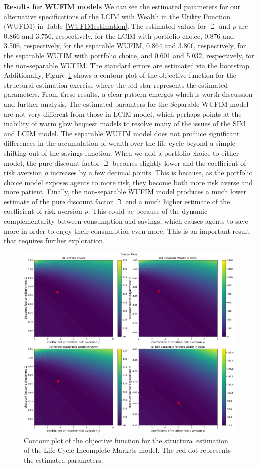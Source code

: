 \documentclass{article}
\newcommand{\CRRA}{\rho}
\begin{document}
\textbf{Results for WUFIM models} We can see the estimated parameters for our alternative specifications of the LCIM with Wealth in the Utility Function (WUFIM) in Table~\ref{WUFIMestimation}. The estimated values for $\beth$ and $\CRRA$ are 0.866 and 3.756, respectively, for the LCIM with portfolio choice, 0.876 and 3.506, respectively, for the separable WUFIM, 0.864 and 3.806, respectively, for the separable WUFIM with portfolio choice, and 0.601 and 5.032, respectively, for the non-separable WUFIM. The standard errors are estimated via the bootstrap. Additionally, Figure~\ref{fig:AllSMMcontour} shows a contour plot of the objective function for the structural estimation exercise where the red star represents the estimated parameters. From these results, a clear pattern emerges which is worth discussion and further analysis. The estimated paramters for the Separable WUFIM model are not very different from those in LCIM model, which perhaps points at the inability of warm glow bequest models to resolve many of the issues of the SIM and LCIM model. The separable WUFIM model does not produce significant differences in the accumulation of wealth over the life cycle beyond a simple shifting out of the savings function. When we add a portfolio choice to either model, the pure discount factor $\beth$ becomes slightly lower and the coefficient of risk aversion $\CRRA$ increases by a few decimal points. This is because, as the portfolio choice model exposes agents to more risk, they become both more risk averse and more patient. Finally, the non-separable WUFIM model produces a much lower estimate of the pure discount factor $\beth$ and a much higher estimate of the coefficient of risk aversion $\CRRA$. This could be because of the dynamic complementarity between consumption and savings, which causes agents to save more in order to enjoy their consumption even more. This is an important result that requires further exploration.

\begin{figure}[!htbp]
\centering
\includegraphics[width=0.7\linewidth]{files/AllSMMcontour-61083533183861c53042688308f7803e.pdf}
\caption{Contour plot of the objective function for the structural estimation of the Life Cycle Incomplete Markets model. The red dot represents the estimated parameters.}
\label{fig:AllSMMcontour}
\end{figure}
\end{document}
